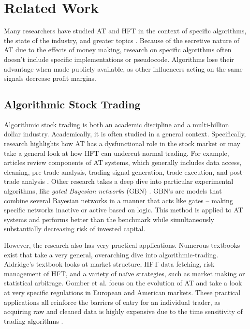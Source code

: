 \documentclass[../thesis.tex]{subfiles}
\begin{document}
\chapter{Related Work}
\label{ch:relatedwork}

Many researchers have studied AT and HFT in the context of specific algorithms, the state of the industry, and greater topics \cite{Treleaven2013}. Because of the secretive nature of AT due to the effects of money making, research on specific algorithms often doesn't include specific implementations or pseudocode. Algorithms lose their advantage when made publicly available, as other influencers acting on the same signals decrease profit margins. 

\section{Algorithmic Stock Trading}

Algorithmic stock trading is both an academic discipline and a multi-billion dollar industry. Academically, it is often studied in a general context. Specifically, research highlights how AT has a dysfunctional role in the stock market or may take a general look at how HFT can undercut normal trading.  For example, articles review components of AT systems, which generally includes data access, cleaning, pre-trade analysis, trading signal generation, trade execution, and post-trade analysis \cite{Treleaven2013}. Other research takes a deep dive into particular experimental algorithms, like \textit{gated Bayesian networks} (GBN) \cite{Bendtsen2016}. GBN's are models that combine several Bayesian networks in a manner that acts like gates -- making specific networks inactive or active based on logic. This method is applied to AT systems and performs better than the benchmark while simultaneously substantially decreasing risk of invested capital. 

However, the research also has very practical applications. Numerous textbooks exist that take a very general, overarching dive into algorithmic-trading. Aldridge's textbook \cite{Aldridge2010} looks at market structure, HFT data fetching, risk management of HFT, and a variety of na\"{i}ve strategies, such as market making or statistical arbitrage. Gomber et al. \cite{Gomber2011} focus on the evolution of AT and take a look at very specific regulations in European and American markets. These practical applications all reinforce the barriers of entry for an individual trader, as acquiring raw and cleaned data is highly expensive due to the time sensitivity of trading algorithms \cite{Treleaven2013}. 
\end{document}
